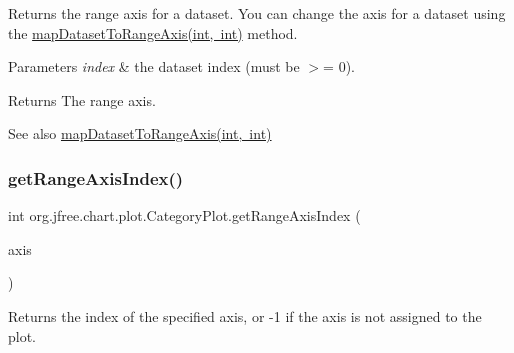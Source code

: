Returns the range axis for a dataset. You can change the axis for a dataset using the \mbox{\hyperlink{classorg_1_1jfree_1_1chart_1_1plot_1_1_category_plot_a99162f519931f2553fb014dd0fe174e2}{map\+Dataset\+To\+Range\+Axis(int, int)}} method.


\begin{DoxyParams}{Parameters}
{\em index} & the dataset index (must be $>$= 0).\\
\hline
\end{DoxyParams}
\begin{DoxyReturn}{Returns}
The range axis.
\end{DoxyReturn}
\begin{DoxySeeAlso}{See also}
\mbox{\hyperlink{classorg_1_1jfree_1_1chart_1_1plot_1_1_category_plot_a99162f519931f2553fb014dd0fe174e2}{map\+Dataset\+To\+Range\+Axis(int, int)}} 
\end{DoxySeeAlso}
\mbox{\label{classorg_1_1jfree_1_1chart_1_1plot_1_1_category_plot_aeaf9ec4110c7ecfb4bdddddf232e9bba}} 
\subsubsection{\texorpdfstring{get\+Range\+Axis\+Index()}{getRangeAxisIndex()}}
{\footnotesize\ttfamily int org.\+jfree.\+chart.\+plot.\+Category\+Plot.\+get\+Range\+Axis\+Index (\begin{DoxyParamCaption}\item[{\mbox{\hyperlink{classorg_1_1jfree_1_1chart_1_1axis_1_1_value_axis}{Value\+Axis}}}]{axis }\end{DoxyParamCaption})}

Returns the index of the specified axis, or {\ttfamily -\/1} if the axis is not assigned to the plot.


